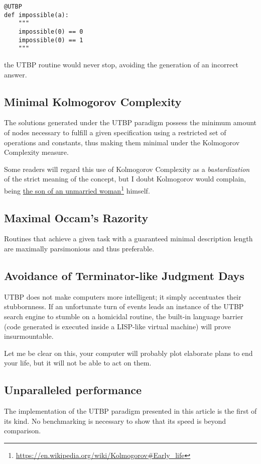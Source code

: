 \documentclass[12pt,twocolumn]{article}
\newcommand\fnurl[2]{%
  \href{#1}{#2}\footnote{\url{#1}}%
}
\begin{document}
\begin{verbatim}
@UTBP
def impossible(a):
    """
    impossible(0) == 0
    impossible(0) == 1
    """
\end{verbatim}

the UTBP routine would never stop, avoiding the generation of an incorrect answer.

\subsection{Minimal Kolmogorov Complexity}
The solutions generated under the UTBP paradigm possess the minimum amount of nodes necessary to fulfill a given specification using a restricted set of operations and constants, thus making them minimal under the Kolmogorov Complexity measure. 

Some readers will regard this use of Kolmogorov Complexity as a \emph{bastardization} of the strict meaning of the concept, but I doubt Kolmogorov would complain, being \fnurl{https://en.wikipedia.org/wiki/Kolmogorov\#Early\_life}{the son of an unmarried woman} himself.

\subsection{Maximal Occam's Razority}
Routines that achieve a given task with a guaranteed minimal description length are maximally parsimonious and thus preferable.

\subsection{Avoidance of Terminator-like Judgment Days}
UTBP does not make computers more intelligent; it simply accentuates their stubbornness. If an unfortunate turn of events leads an instance of the UTBP search engine to stumble on a homicidal routine, the built-in language barrier (code generated is executed inside a LISP-like virtual machine) will prove insurmountable.

Let me be clear on this, your computer will probably plot elaborate plans to end your life, but it will not be able to act on them.

\subsection{Unparalleled performance}
The implementation of the UTBP paradigm presented in this article is the first of its kind. No benchmarking is necessary to show that its speed is beyond comparison.
\end{document}

